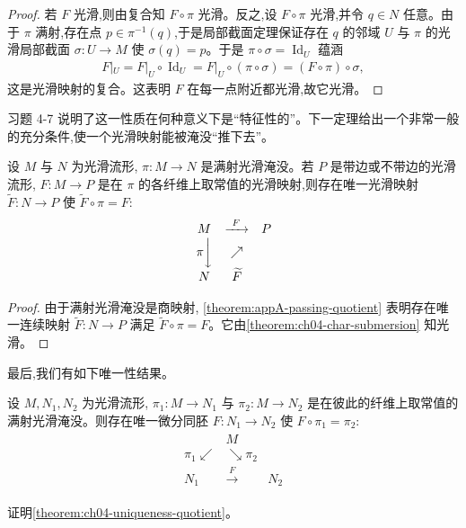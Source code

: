 \documentclass[../../main.tex]{subfiles}
\begin{document}
\begin{proof}
若 $F$ 光滑,则由复合知 $F\circ\pi$ 光滑。反之,设 $F\circ\pi$ 光滑,并令 $q\in N$ 任意。由于 $\pi$ 满射,存在点 $p\in\pi^{-1}(q)$,于是局部截面定理保证存在 $q$ 的邻域 $U$ 与 $\pi$ 的光滑局部截面 $\sigma:U\to M$ 使 $\sigma(q)=p$。于是 $\pi\circ\sigma=\operatorname{Id}_U$ 蕴涵
\begin{align*}
F|_U=F|_U\circ\operatorname{Id}_U=F|_U\circ(\pi\circ\sigma)=(F\circ\pi)\circ\sigma,
\end{align*}
这是光滑映射的复合。这表明 $F$ 在每一点附近都光滑,故它光滑。
\end{proof}

习题 4-7 说明了这一性质在何种意义下是``特征性的''。下一定理给出一个非常一般的充分条件,使一个光滑映射能被淹没``推下去''。

\begin{theorem}\label{theorem:ch04-pass-quotient}
设 $M$ 与 $N$ 为光滑流形, $\pi:M\to N$ 是满射光滑淹没。若 $P$ 是带边或不带边的光滑流形, $F:M\to P$ 是在 $\pi$ 的各纤维上取常值的光滑映射,则存在唯一光滑映射 $\widetilde{F}:N\to P$ 使 $\widetilde{F}\circ\pi=F$:
\begin{align*}
\begin{array}{ccc}
M & \xrightarrow{\ F\ } & P\\
\pi\bigg\downarrow & \nearrow &\\
N & \widetilde{F} &
\end{array}
\end{align*}
\end{theorem}

\begin{proof}
由于满射光滑淹没是商映射, \cref{theorem:appA-passing-quotient} 表明存在唯一连续映射 $\widetilde{F}:N\to P$ 满足 $\widetilde{F}\circ\pi=F$。它由\cref{theorem:ch04-char-submersion} 知光滑。
\end{proof}

最后,我们有如下唯一性结果。

\begin{theorem}\label{theorem:ch04-uniqueness-quotient}
设 $M,N_1,N_2$ 为光滑流形, $\pi_1:M\to N_1$ 与 $\pi_2:M\to N_2$ 是在彼此的纤维上取常值的满射光滑淹没。则存在唯一微分同胚 $F:N_1\to N_2$ 使 $F\circ\pi_1=\pi_2$:
\begin{align*}
\begin{array}{ccc}
 & M &\\
\pi_1\swarrow & \searrow\pi_2 &\\
N_1 & \xrightarrow{\ F\ } & N_2
\end{array}
\end{align*}
\end{theorem}

\begin{exercise}\label{exercise:ch04-prove-uniqueness-quotient}
证明\cref{theorem:ch04-uniqueness-quotient}。
\end{exercise}
\end{document}
